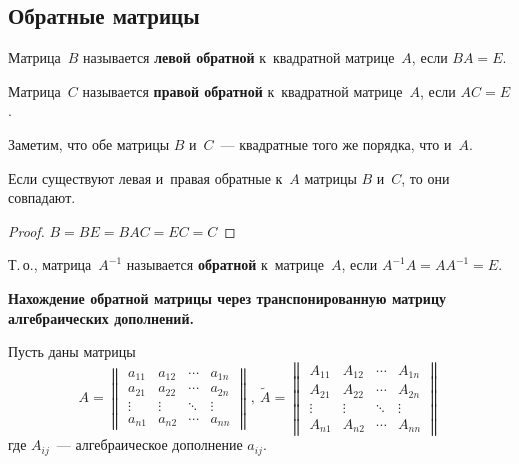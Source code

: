 \subsection{Обратные матрицы}
Матрица~$B$ называется \textbf{левой обратной} к~квадратной матрице~$A$, если $BA = E$.

Матрица~$C$ называется \textbf{правой обратной} к~квадратной матрице~$A$, если $AC = E$.

Заметим, что обе матрицы $B$ и~$C$~--- квадратные того же порядка, что и~$A$.

\begin{statement}
Если существуют левая и~правая обратные к~$A$ матрицы $B$ и~$C$, то они совпадают.
\end{statement}
\begin{proof}
$B = BE = BAC = EC = C$
\end{proof}

Т.\,о., матрица~$A^{-1}$ называется \textbf{обратной} к~матрице~$A$, если $A^{-1} A = A A^{-1} = E$.

\textbf{Нахождение обратной матрицы через транспонированную матрицу алгебраических дополнений.}

Пусть даны матрицы
\begin{equation*}
A =
\begin{Vmatrix}
a_{11} & a_{12} & \cdots & a_{1n} \\
a_{21} & a_{22} & \cdots & a_{2n} \\
\vdots & \vdots & \ddots & \vdots \\
a_{n1} & a_{n2} & \cdots & a_{nn}
\end{Vmatrix}, \ 
\tilde A =
\begin{Vmatrix}
A_{11} & A_{12} & \cdots & A_{1n} \\
A_{21} & A_{22} & \cdots & A_{2n} \\
\vdots & \vdots & \ddots & \vdots \\
A_{n1} & A_{n2} & \cdots & A_{nn}
\end{Vmatrix}
\end{equation*}
где $A_{ij}$~--- алгебраическое дополнение $a_{ij}$.

